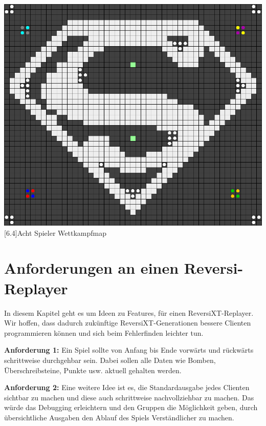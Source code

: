 \documentclass[12pt,a4paper,bibliography=totocnumbered,listof=totocnumbered]{scrartcl}
\begin{document}
		\vspace{1em}
	\begin{minipage}{\linewidth}
		\centering
		\includegraphics[width=0.66\linewidth]{pics/Kapitel_6/SupermanMap.png}
		[6.4]{Acht Spieler Wettkampfmap}
		\label{fig:6.}
	\end{minipage}
	\vspace{1em}
	
	\section{Anforderungen an einen Reversi-Replayer}
	\vspace{1em}
	
	In diesem Kapitel geht es um Ideen zu Features, für einen ReversiXT-Replayer. Wir hoffen, dass dadurch zukünftige ReversiXT-Generationen bessere Clienten programmieren können und sich beim Fehlerfinden leichter tun.
	
	\textbf{Anforderung 1:} Ein Spiel sollte von Anfang bis Ende vorwärts und rückwärts schrittweise durchgehbar sein. Dabei sollen alle Daten wie Bomben, Überschreibsteine, Punkte usw. aktuell gehalten werden.
	
	\textbf{Anforderung 2:} Eine weitere Idee ist es, die Standardausgabe jedes Clienten sichtbar zu machen und diese auch schrittweise nachvollziehbar zu machen. Das würde das Debugging erleichtern und den Gruppen die Möglichkeit geben, durch übersichtliche Ausgaben den Ablauf des Spiels Verständlicher zu machen.
	
\end{document}
